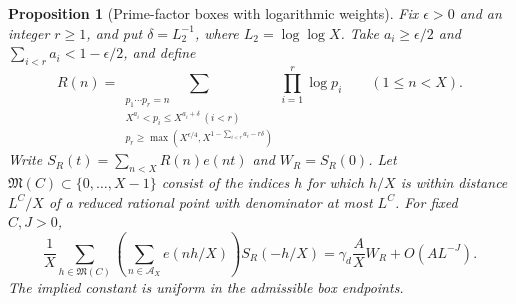 \documentclass[11pt,a4paper]{article}
\theoremstyle{paperplain}
\newtheorem{proposition}[theorem]{Proposition}
\numberwithin{equation}{section}
\begin{document}
\begin{proposition}[Prime-factor boxes with logarithmic weights]\label{arith:major}
Fix $\epsilon>0$ and an integer $r\ge1$, and put $\delta=L_2^{-1}$,
where $L_2=\log\log X$.
Take $a_i\ge\epsilon/2$ and $\sum_{i<r}a_i<1-\epsilon/2$, and define
\[
 R(n)=\sum_{\substack{p_1\cdots p_r=n\\
 X^{a_i}<p_i\le X^{a_i+\delta}\ (i<r)\\
 p_r\ge\max(X^{\epsilon/4},X^{1-\sum_{i<r}a_i-r\delta})}}
       \prod_{i=1}^r\log p_i\qquad(1\le n<X).
\]
Write $S_R(t)=\sum_{n<X}R(n)e(nt)$ and $W_R=S_R(0)$.
Let $\mathfrak M(C)\subset\{0,\ldots,X-1\}$ consist of the indices $h$
for which $h/X$ is within distance $L^C/X$ of a reduced rational point
with denominator at most $L^C$. For fixed $C,J>0$,
\begin{equation}\label{arith:majorformula}
 \frac1X\sum_{h\in\mathfrak M(C)}
       \left(\sum_{n\in\mathcal A_X}e(nh/X)\right)S_R(-h/X)
   =\gamma_d\frac AX W_R+O(A L^{-J}).
\end{equation}
The implied constant is uniform in the admissible box endpoints.
\end{proposition}
\end{document}
